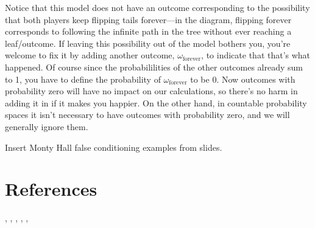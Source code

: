 Notice that this model does not have an outcome corresponding to the
possibility that both players keep flipping tails forever---in the
diagram, flipping forever corresponds to following the infinite path
in the tree without ever reaching a leaf/outcome.  If leaving this
possibility out of the model bothers you, you're welcome to fix it by
adding another outcome, $\omega_{\text{forever}}$, to indicate that that's
what happened.  Of course since the probabililities of the other
outcomes already sum to 1, you have to define the probability of
$\omega_{\text{forever}}$ to be 0.  Now outcomes with probability zero will
have no impact on our calculations, so there's no harm in adding it in
if it makes you happier.  On the other hand, in countable probability
spaces it isn't necessary to have outcomes with probability zero, and
we will generally ignore them.

\begin{problems}
\classproblems
{}

\homeworkproblems
{}

\homeworkproblems
{}

\end{problems}

\begin{editingnotes}
Insert Monty Hall false conditioning examples from slides.
\end{editingnotes}

\section{References}

\cite{Ross2001},
\cite{Ross2002},
\cite{GrinsteadS}
\cite{MR0228020}, %
\cite{MR1854128}  %
\cite{MR2144605}  %
\cite{LawlerC1999},
\cite{Malkiel2003},
\cite{MR1344451}   %

\endinput
